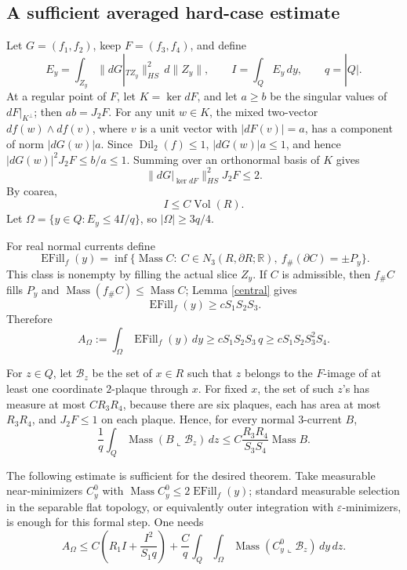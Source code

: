 \documentclass[12pt]{article}
\newcommand{\Dil}{\operatorname{Dil}}
\newcommand{\Vol}{\operatorname{Vol}}
\newcommand{\Mass}{\operatorname{Mass}}
\newcommand{\EFill}{\operatorname{EFill}}
\begin{document}
\subsection*{A sufficient averaged hard-case estimate}

Let \(G=(f_1,f_2)\), keep \(F=(f_3,f_4)\), and define
\[
E_y=\int_{Z_y}\|dG|_{TZ_y}\|_{HS}^2\,d\|Z_y\|,\qquad
I=\int_QE_y\,dy,\qquad q=|Q|.
\]
At a regular point of \(F\), let \(K=\ker dF\), and let \(a\ge b\) be the
singular values of \(dF|_{K^\perp}\); then \(ab=J_2F\).  For any unit
\(w\in K\), the mixed two-vector \(df(w)\wedge df(v)\), where \(v\) is a
unit vector with \(|dF(v)|=a\), has a component of norm
\(|dG(w)|a\).  Since \(\Dil_2(f)\le1\), \(|dG(w)|a\le1\), and hence
\(|dG(w)|^2J_2F\le b/a\le1\).  Summing over an orthonormal basis of \(K\)
gives
\[
        \|dG|_{\ker dF}\|_{HS}^2J_2F\le2 .
\]
By coarea,
\begin{equation}\label{Icoarea}
        I\le C\Vol(R).
\end{equation}
Let \(\Omega=\{y\in Q:E_y\le4I/q\}\), so \(|\Omega|\ge3q/4\).

For real normal currents define
\[
\EFill_f(y)=\inf\{\Mass C:\ C\in N_3(R,\partial R;\mathbb R),\
        f_\#(\partial C)=\pm P_y\}.
\]
This class is nonempty by filling the actual slice \(Z_y\).  If \(C\) is
admissible, then \(f_\#C\) fills \(P_y\) and \(\Mass(f_\#C)\le\Mass C\);
Lemma \ref{central} gives
\begin{equation}\label{EFilllower}
        \EFill_f(y)\ge cS_1S_2S_3 .
\end{equation}
Therefore
\begin{equation}\label{AElower}
A_\Omega:=\int_\Omega\EFill_f(y)\,dy
        \ge cS_1S_2S_3\,q
        \ge cS_1S_2S_3^2S_4 .
\end{equation}

For \(z\in Q\), let \({\mathcal B}_z\) be the set of \(x\in R\) such that
\(z\) belongs to the \(F\)-image of at least one coordinate \(2\)-plaque
through \(x\).  For fixed \(x\), the set of such \(z\)'s has measure at most
\(CR_3R_4\), because there are six plaques, each has area at most \(R_3R_4\),
and \(J_2F\le1\) on each plaque.  Hence, for every normal \(3\)-current \(B\),
\begin{equation}\label{badfubini}
 \frac1q\int_Q\Mass(B\llcorner{\mathcal B}_z)\,dz
 \le C\frac{R_3R_4}{S_3S_4}\Mass B .
\end{equation}

The following estimate is sufficient for the desired theorem.  Take measurable
near-minimizers \(C_y^0\) with
\(\Mass C_y^0\le2\EFill_f(y)\); standard measurable selection in the
separable flat topology, or equivalently outer integration with
\(\varepsilon\)-minimizers, is enough for this formal step.  One needs
\begin{equation}\tag{EAT}\label{EAT}
 A_\Omega
 \le C\left(R_1I+\frac{I^2}{S_1q}\right)
 +\frac{C}{q}\int_Q\int_\Omega
       \Mass(C_y^0\llcorner{\mathcal B}_z)\,dy\,dz .
\end{equation}
\end{document}
